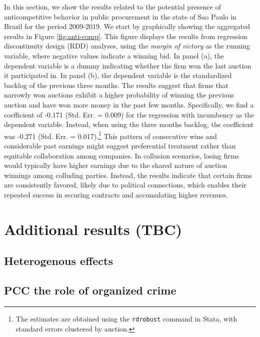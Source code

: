 \documentclass[12 pt]{elsarticle}
\begin{document}
In this section, we show the results related to the potential presence of anticompetitive behavior in public procurement in the state of Sao Paulo in Brazil for the period 2009-2019. We start by graphically showing the aggregated results in Figure \ref{fig:anti-comp}. This figure displays the results from regression discontinuity design (RDD) analyses, using the \textit{margin of victory} as the running variable, where negative values indicate a winning bid. In panel (a), the dependent variable is a dummy indicating whether the firm won the last auction it participated in. In panel (b), the dependent variable is the standardized backlog of the previous three months. The results suggest that firms that narrowly won auctions exhibit a higher probability of winning the previous auction and have won more money in the past few months. Specifically, we find a coefficient of -0.171 (Std. Err. = 0.009) for the regression with incumbency as the dependent variable. Instead, when using the three months backlog, the coefficient was -0.271 (Std. Err. = 0.017).\footnote{The estimates are obtained using the \texttt{rdrobust} command in Stata, with standard errors clustered by auction.} This pattern of consecutive wins and considerable past earnings might suggest preferential treatment rather than equitable collaboration among companies. In collusion scenarios, losing firms would typically have higher earnings due to the shared nature of auction winnings among colluding parties. Instead, the results indicate that certain firms are consistently favored, likely due to political connections, which enables their repeated success in securing contracts and accumulating higher revenues. 







\section{Additional results (TBC)}\label{res_ar}
\subsection{Heterogenous effects}
\subsection{PCC the role of organized crime}
\end{document}
